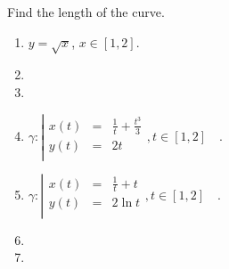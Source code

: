 Find the length of the curve. 
\begin{enumerate}[ref={\fcProblemRef}]
\item $y=\sqrt{x}$, $x\in [1, 2]$.

\item 
\item 


\item $\gamma:\left| 
\begin{array}{rcl}
x(t)&=&\frac{1}{t}+\frac{t^3}{3}\\
y(t)&=&2t\\
\end{array}\right., t\in [1,2]\quad . $
\item  $\gamma:\left| 
\begin{array}{rcl}
x(t)&=&\frac{1}{t}+t\\
y(t)&=&2\ln t\\
\end{array}\right., t\in [1,2]\quad . $

\item 
\item 

\end{enumerate}
